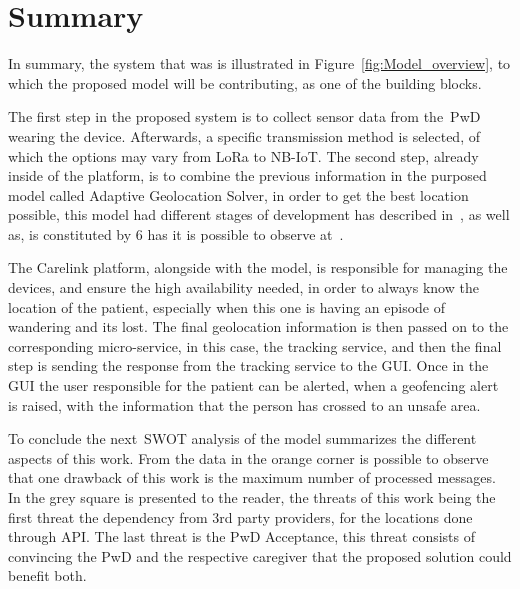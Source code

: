  
 
 
 
 
 
 
 
 
 
 
 
 
 

 
 
 
 
 
 
 
\newpage
\section{Summary}
\label{summary}
In summary, the system that was is illustrated in Figure~\ref{fig:Model_overview}, to which the proposed model will be contributing, as one of the building blocks. 

The first step in the proposed system is to collect sensor data from the~\gls{PwD} wearing the device. Afterwards, a specific transmission method is selected, of which the options may vary from LoRa to NB-IoT.
The second step, already inside of the platform, is to combine the previous information in the purposed model called Adaptive Geolocation Solver, in order to get the best location possible, this model had different stages of development has described in~, as well as, is constituted by 6 has it is possible to observe at~. 

The Carelink platform, alongside with the model, is responsible for managing the devices, and ensure the high availability needed, in order to always know the location of the patient, especially when this one is having an episode of wandering and its lost. 
The final geolocation information is then passed on to the corresponding micro-service, in this case, the tracking service, and then the final step is sending the response from the tracking service to the GUI.
Once in the GUI the user responsible for the patient can be alerted,  when a geofencing alert is raised, with the information that the person has crossed to an unsafe area.

To conclude the next~\acrshort{SWOT} analysis of the model summarizes the different aspects of this work. From the data in the orange corner is possible to observe that one drawback of this work is the maximum number of processed messages. In the grey square is presented to the reader, the threats of this work being the first threat the dependency from 3rd party providers, for the locations done through API. The last threat is the PwD Acceptance, this threat consists of convincing the PwD and the respective caregiver that the proposed solution could benefit both.



